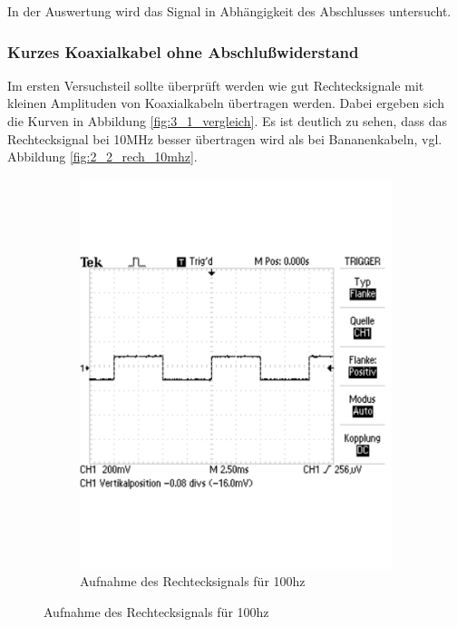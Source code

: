 \documentclass[12pt,a4paper]{article}
\begin{document}
In der Auswertung wird das Signal in Abhängigkeit des Abschlusses untersucht.

\subsubsection{Kurzes Koaxialkabel ohne Abschlußwiderstand}
Im ersten Versuchsteil sollte überprüft werden wie gut Rechtecksignale mit kleinen Amplituden von Koaxialkabeln übertragen werden. Dabei ergeben sich die Kurven in Abbildung \ref{fig:3_1_vergleich}. Es ist deutlich zu sehen, dass das Rechtecksignal bei 10MHz besser übertragen wird als bei Bananenkabeln, vgl. Abbildung \ref{fig:2_2_rech_10mhz}.

\begin{figure}[H]
        \centering
        \begin{subfigure}[tb]{0.48\textwidth}
                \includegraphics[width=\textwidth , scale = 0.4]{3_1_100hz.pdf}
				\caption[Aufnahme des Rechtecksignals für 100hz]{Aufnahme des Rechtecksignals für 100hz}
 	 			\label{fig:3_1_100hz}
        \end{subfigure}%

\end{figure}
\end{document}
